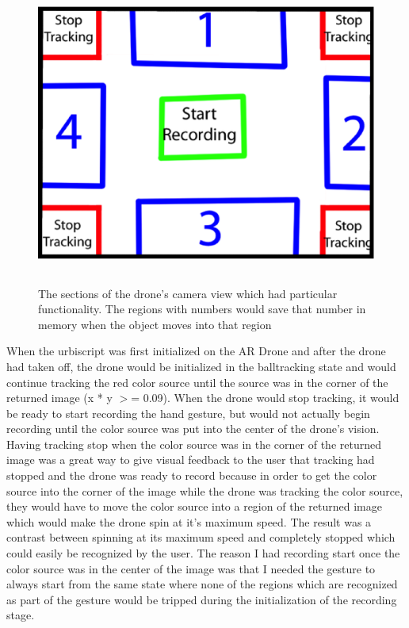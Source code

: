\documentclass[a4paper,12pt]{report}
\begin{document}
\begin{figure}
 \centering
\includegraphics[height=100mm] {image_sections.eps}
\caption{The sections of the drone's camera view which had particular functionality. The regions with numbers would save that number in memory when the object moves into that region}
\end{figure}

When the urbiscript was first initialized on the AR Drone and after the drone had taken off, the drone would be initialized in the balltracking state and would continue tracking the red color source until the source was in the 
corner of the returned image (x * y $>$= 0.09). When the drone would stop tracking, it would be ready to start recording the hand gesture, but would not actually begin recording until the color source was put into the center of the drone's vision. Having tracking stop when the color source was in the corner of the returned image was a great way to give visual feedback to the user that tracking had stopped and the drone was ready to record because in order to get the color source into the corner of the image while the drone was tracking the color source, they would have to move the color source into a region of the returned image which would make the drone spin at it's maximum speed. The result was a contrast between spinning at its maximum speed and completely stopped which could easily be recognized by the user. The reason I had recording start once the color source was in the center of the image was that I needed the gesture to always start from the same state where none of the regions which are recognized as part of the gesture would be tripped during the initialization of the recording stage.
\end{document}
